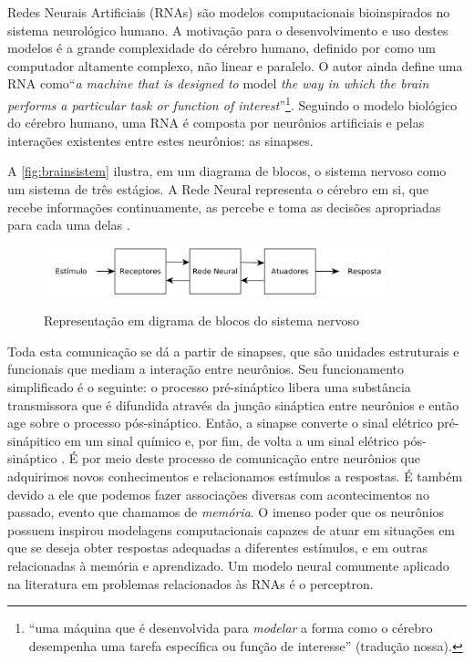 Redes Neurais Artificiais (RNAs) são modelos computacionais bioinspirados no sistema neurológico humano. A motivação para o desenvolvimento e uso destes modelos é a grande complexidade do cérebro humano, definido por  como um computador altamente complexo, não linear e paralelo. O autor ainda define uma RNA como``\textit{a machine that is designed to} model \textit{the way in which the brain performs a particular task or function of interest}''\footnote{``uma máquina que é desenvolvida para \textit{modelar} a forma como o cérebro desempenha uma tarefa específica ou função de interesse'' (tradução nossa).}. Seguindo o modelo biológico do cérebro humano, uma RNA é composta por neurônios artificiais e pelas interações existentes entre estes neurônios: as sinapses.

A \autoref{fig:brainsistem} ilustra, em um diagrama de blocos, o sistema nervoso como um sistema de três estágios. A Rede Neural representa o cérebro em si, que recebe informações continuamente, as percebe e toma as decisões apropriadas para cada uma delas \cite[p.~24]{Haykin1998}.

\begin{figure}[!htb]
    \centering
    \caption{Representação em digrama de blocos do sistema nervoso}
    \includegraphics[width=0.9\textwidth]{./04-figuras/brain_sistem_block_diagram}
    \label{fig:brainsistem}
\end{figure}

Toda esta comunicação se dá a partir de sinapses, que são unidades estruturais e funcionais que mediam a interação entre neurônios. Seu funcionamento simplificado é o seguinte: o processo pré-sináptico libera uma substância transmissora que é difundida através da junção sináptica entre neurônios e então age sobre o processo pós-sináptico. Então, a sinapse converte o sinal elétrico pré-sinápitico em um sinal químico e, por fim, de volta a um sinal elétrico pós-sináptico \cite[p.~28]{Haykin1998}. É por meio deste processo de comunicação entre neurônios que adquirimos novos conhecimentos e relacionamos estímulos a respostas. É também devido a ele que podemos fazer associações diversas com acontecimentos no passado, evento que chamamos de \textit{memória}. O imenso poder que os neurônios possuem inspirou modelagens computacionais capazes de atuar em situações em que se deseja obter respostas adequadas a diferentes estímulos, e em outras relacionadas à memória e aprendizado. Um modelo neural comumente aplicado na literatura em problemas relacionados às RNAs é o perceptron. 

